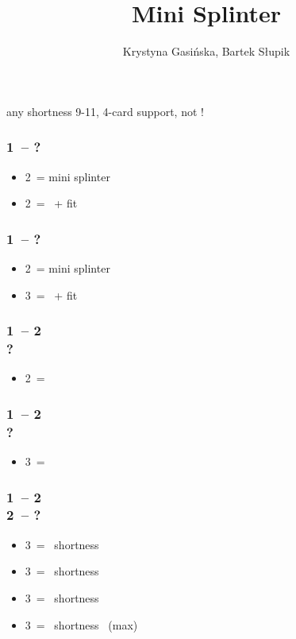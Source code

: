 \documentclass[12pt, a4paper]{article}
\title{Mini Splinter}
\author{Krystyna Gasińska, Bartek Słupik}
\begin{document}
\maketitle


any shortness 9-11, 4-card support, not \gf!

\subsubsection*{1\hearts\ -- ?}
\begin{itemize}
    \item 2\spades\ = mini splinter
    \item 2\nt\ = \inv\ + fit
\end{itemize}

\subsubsection*{1\spades\ -- ?}
\begin{itemize}
    \item 2\nt\ = mini splinter
    \item 3\hearts\ = \inv\ + fit
\end{itemize}

\subsubsection*{1\hearts\ -- 2\spades \\ ?}
\begin{itemize}
    \item 2\nt\ = \lsf
\end{itemize}

\subsubsection*{1\spades\ -- 2\nt \\ ?}
\begin{itemize}
    \item 3\clubs\ = \lsf
\end{itemize}

\subsubsection*{1\hearts\ -- 2\spades \\ 2\nt\ -- ?}
\begin{itemize}
    \item 3\clubs\ = \clubs\ shortness
    \item 3\diams\ = \diams\ shortness
    \item 3\hearts\ = \spades\ shortness
    \item 3\spades\ = \spades\ shortness \gf\ (max)
\end{itemize}
\end{document}
